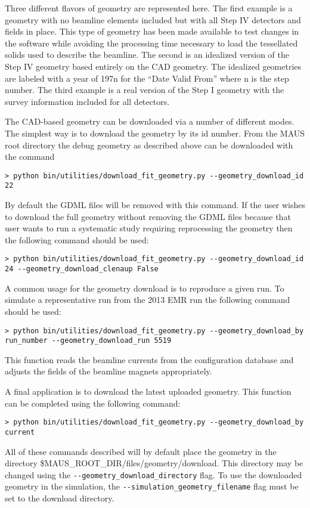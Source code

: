 Three different flavors of geometry are represented here. The first
example is a geometry with no beamline elements included but with all
Step IV detectors and fields in place. This type of geometry has been
made available to test changes in the software while avoiding the
processing time necessary to load the tessellated solids used to
describe the beamline. The second is an idealized version of the Step
IV geometry based entirely on the CAD geometry. The idealized
geometries are labeled with a year of 197n for the ``Date Valid
From'' where n is the step number. The third example is a real version
of the Step I geometry with the survey information included for all
detectors.

The CAD-based geometry can be downloaded via a number of different
modes. The simplest way is to download the geometry by its id
number. From the MAUS root directory the debug geometry as described
above can be downloaded with the command
\begin{verbatim}
> python bin/utilities/download_fit_geometry.py --geometry_download_id 22
\end{verbatim}
By default the GDML files will be removed with this command. If the
user wishes to download the full geometry without removing the GDML
files because that user wants to run a systematic study requiring
reprocessing the geometry then the following command should be used:
\begin{verbatim}
> python bin/utilities/download_fit_geometry.py --geometry_download_id 24 --geometry_download_clenaup False
\end{verbatim}

A common usage for the geometry download is to reproduce a given
run. To simulate a representative run from the 2013 EMR run the
following command should be used:
\begin{verbatim}
> python bin/utilities/download_fit_geometry.py --geometry_download_by run_number --geometry_download_run 5519
\end{verbatim}
This function reads the beamline currents from the configuration
database and adjusts the fields of the beamline magnets appropriately.

A final application is to download the latest uploaded geometry. This
function can be completed using the following command:
\begin{verbatim}
> python bin/utilities/download_fit_geometry.py --geometry_download_by current
\end{verbatim}
All of these commands described will by default place the geometry in
the directory \${MAUS\_ROOT\_DIR}/files/geometry/download. This
directory may be changed using the
\verb+--geometry_download_directory+ flag. To use the downloaded
geometry in the simulation, the \verb+--simulation_geometry_filename+
flag must be set to the download directory. 
